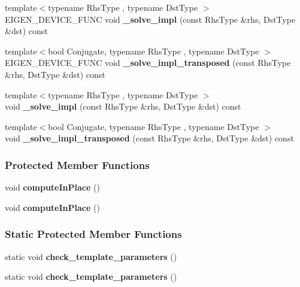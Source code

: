 \begin{DoxyCompactItemize}
{\footnotesize template$<$typename Rhs\+Type , typename Dst\+Type $>$ }\\E\+I\+G\+E\+N\+\_\+\+D\+E\+V\+I\+C\+E\+\_\+\+F\+U\+NC void {\bfseries \+\_\+solve\+\_\+impl} (const Rhs\+Type \&rhs, Dst\+Type \&dst) const
\item 
\mbox{\label{group___l_u___module_a42cfd4d27becb5b0a4f2ccd007dd4fb3}} 
{\footnotesize template$<$bool Conjugate, typename Rhs\+Type , typename Dst\+Type $>$ }\\E\+I\+G\+E\+N\+\_\+\+D\+E\+V\+I\+C\+E\+\_\+\+F\+U\+NC void {\bfseries \+\_\+solve\+\_\+impl\+\_\+transposed} (const Rhs\+Type \&rhs, Dst\+Type \&dst) const
\item 
\mbox{\label{group___l_u___module_af67fb62666f74a2e65cb02456918d913}} 
{\footnotesize template$<$typename Rhs\+Type , typename Dst\+Type $>$ }\\void {\bfseries \+\_\+solve\+\_\+impl} (const Rhs\+Type \&rhs, Dst\+Type \&dst) const
\item 
\mbox{\label{group___l_u___module_ab1fcd233b1e1ca3fbce6f56c615ab0b6}} 
{\footnotesize template$<$bool Conjugate, typename Rhs\+Type , typename Dst\+Type $>$ }\\void {\bfseries \+\_\+solve\+\_\+impl\+\_\+transposed} (const Rhs\+Type \&rhs, Dst\+Type \&dst) const
\end{DoxyCompactItemize}
\subsubsection*{Protected Member Functions}
\begin{DoxyCompactItemize}
\item 
\mbox{\label{group___l_u___module_ae2ef37e62e6f776e1958d6a7591863c2}} 
void {\bfseries compute\+In\+Place} ()
\item 
\mbox{\label{group___l_u___module_ac2da044a537003819f83a3513d8135d0}} 
void {\bfseries compute\+In\+Place} ()
\end{DoxyCompactItemize}
\subsubsection*{Static Protected Member Functions}
\begin{DoxyCompactItemize}
\item 
\mbox{\label{group___l_u___module_a6b17f29cc130870193a75f146bec0e33}} 
static void {\bfseries check\+\_\+template\+\_\+parameters} ()
\item 
\mbox{\label{group___l_u___module_a6b17f29cc130870193a75f146bec0e33}} 
static void {\bfseries check\+\_\+template\+\_\+parameters} ()
\end{DoxyCompactItemize}
